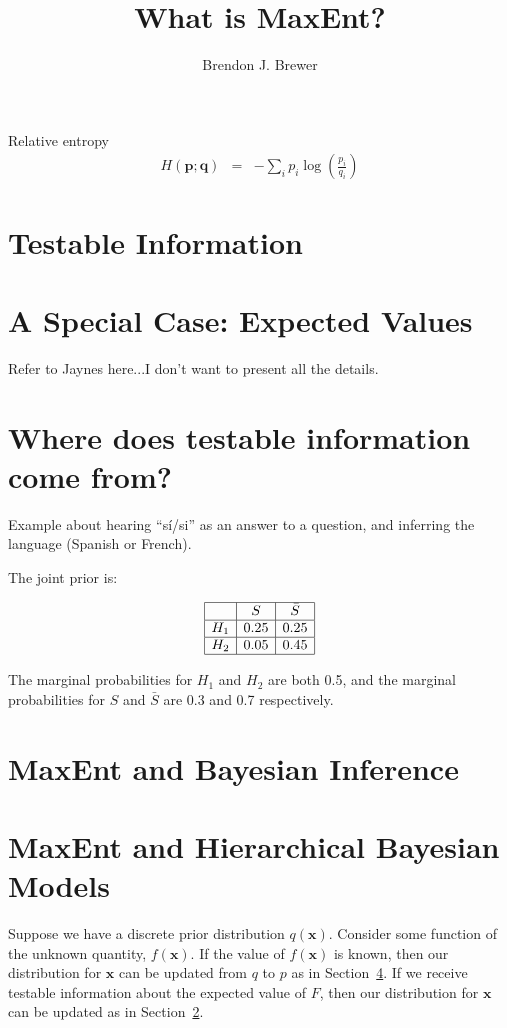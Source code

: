 \documentclass[letterpaper, 11pt]{article}
\title{What is MaxEnt?}
\author{Brendon J. Brewer}
\newcommand{\xx}{\boldsymbol{x}}
\begin{document}
\maketitle



Relative entropy
\begin{eqnarray}
H(\boldsymbol{p}; \boldsymbol{q}) &=& -\sum_i p_i \log\left(\frac{p_i}{q_i}\right) 
\end{eqnarray}

\section{Testable Information}

\section{A Special Case: Expected Values}\label{sec:expectations}
Refer to Jaynes here...I don't want to present all the details.

\section{Where does testable information come from?}

Example about hearing ``sí/si'' as an answer to a question,
and inferring the language (Spanish or French).

The joint prior is:

\begin{eqnarray}
\begin{array}{|c|c|c|}
\hline
	&	S	& \bar{S}\\
\hline
H_1 & 0.25  & 0.25\\
\hline
H_2 & 0.05 & 0.45\\
\hline
\end{array}
\end{eqnarray}

The marginal probabilities for $H_1$ and $H_2$ are both 0.5, and the
marginal probabilities for $S$ and $\bar{S}$ are 0.3 and 0.7 respectively.


\section{MaxEnt and Bayesian Inference}\label{sec:bayes}

\section{MaxEnt and Hierarchical Bayesian Models}
Suppose we have a discrete prior distribution $q(\xx)$. Consider some
function of the unknown quantity, $f(\xx)$.
If the value of $f(\xx)$ is known, then our distribution for $\xx$ can
be updated from $q$ to $p$ as in Section~\ref{sec:bayes}.
If we receive testable information
about the expected value of $F$, then our distribution for $\xx$ can
be updated as in Section~\ref{sec:expectations}.
\end{document}
